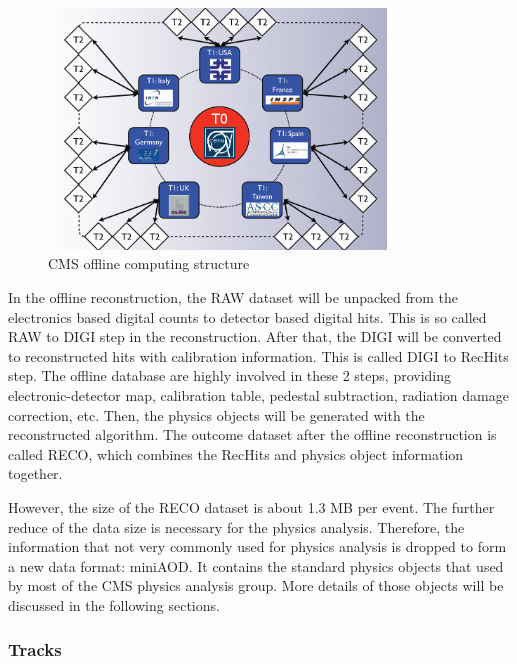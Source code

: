 \begin{figure}[htbp]
 \begin{center}
  \includegraphics[width=0.8\textwidth]{figures/c3/c3_cms_tiers.png}
 \end{center}
 \caption{CMS offline computing structure}
 \label{fig:c3cmstiers}
\end{figure}

In the offline reconstruction, the RAW dataset will be unpacked from the electronics based digital counts to detector based digital hits. This is so called RAW to DIGI step in the reconstruction. After that, the DIGI will be converted to reconstructed hits with calibration information. This is called DIGI to RecHits step. The offline database are highly involved in these 2 steps, providing electronic-detector map, calibration table, pedestal subtraction, radiation damage correction, etc. Then, the physics objects will be generated with the reconstructed algorithm. The outcome dataset after the offline reconstruction is called RECO, which combines the RecHits and physics object information together. 

However, the size of the RECO dataset is about 1.3 MB per event. The further reduce of the data size is necessary for the physics analysis. Therefore, the information that not very commonly used for physics analysis is dropped to form a new data format: miniAOD. It contains the standard physics objects that used by most of the CMS physics analysis group. More details of those objects will be discussed in the following sections. 

\subsubsection{Tracks}

